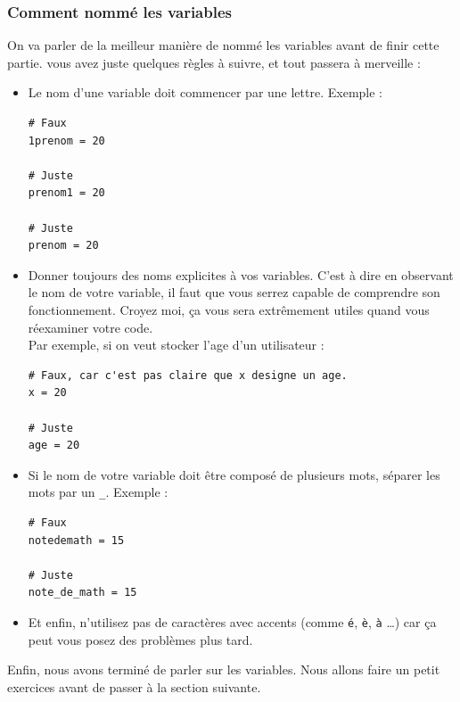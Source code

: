 \documentclass[12pt]{article}
\newcommand{\code}[1]{\colorbox{light-gray}{\texttt{#1}}}
\begin{document}
        \subsubsection{Comment nommé les variables}
            On va parler de la meilleur manière de nommé les variables avant de finir cette partie.
            vous avez juste quelques règles à suivre, et tout passera à merveille :
            \begin{itemize}
                \item Le nom d'une variable doit commencer par une lettre. Exemple :
                    \begin{lstlisting}[style=code]
# Faux
1prenom = 20

# Juste
prenom1 = 20

# Juste
prenom = 20
                    \end{lstlisting}

                \item Donner toujours des noms explicites à vos variables. C'est à dire en observant le nom de votre
                    variable, il faut que vous serrez capable de comprendre son fonctionnement. Croyez moi, ça vous
                    sera extrêmement utiles quand vous réexaminer votre code. \\Par exemple, si on veut stocker
                    l'age d'un utilisateur :
                    \begin{lstlisting}[style=code]
# Faux, car c'est pas claire que x designe un age.
x = 20

# Juste
age = 20
                    \end{lstlisting}

                \item Si le nom de votre variable doit être composé de plusieurs mots, séparer les mots par un \code{\_}.
                    Exemple :
                    \begin{lstlisting}[style=code]
# Faux
notedemath = 15

# Juste
note_de_math = 15
                    \end{lstlisting}

                \item Et enfin, n'utilisez pas de caractères avec accents (comme \code{é}, \code{è}, \code{à} \ldots)
                    car ça peut vous posez des problèmes plus tard.
            \end{itemize}

            Enfin, nous avons terminé de parler sur les variables. Nous allons faire un petit exercices avant de passer
            à la section suivante.
\end{document}
